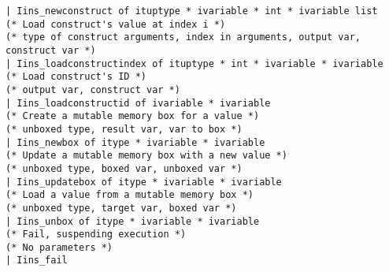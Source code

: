 \begin{verbatim}
| Iins_newconstruct of ituptype * ivariable * int * ivariable list
(* Load construct's value at index i *)
(* type of construct arguments, index in arguments, output var, construct var *)
| Iins_loadconstructindex of ituptype * int * ivariable * ivariable
(* Load construct's ID *)
(* output var, construct var *)
| Iins_loadconstructid of ivariable * ivariable
(* Create a mutable memory box for a value *)
(* unboxed type, result var, var to box *)
| Iins_newbox of itype * ivariable * ivariable
(* Update a mutable memory box with a new value *)
(* unboxed type, boxed var, unboxed var *)
| Iins_updatebox of itype * ivariable * ivariable
(* Load a value from a mutable memory box *)
(* unboxed type, target var, boxed var *)
| Iins_unbox of itype * ivariable * ivariable
(* Fail, suspending execution *)
(* No parameters *)
| Iins_fail
\end{verbatim}